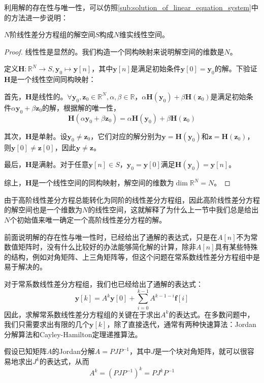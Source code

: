利用解的存在性与唯一性，可以仿照\ref{sub:solution_of_linear_equation_system}中的方法进一步说明：
\begin{theorem}
    $N$阶线性差分方程组的解空间$S$构成$N$维实线性空间。
\end{theorem}
\begin{proof}
    线性性是显然的。我们构造一个同构映射来说明解空间的维数是$N$。

    定义$\mathbf{H}:\mathbb{R}^N\to S,\mathbf{y}_0\mapsto \mathbf{y}[n]$，其中$\mathbf{y}[n]$是满足初始条件$\mathbf{y}[0]=\mathbf{y}_0$的解。下验证$\mathbf{H}$是一个线性空间同构映射：

    首先，$\mathbf{H}$是线性的。$\forall \mathbf{y}_0,\mathbf{z}_0\in\mathbb{R}^N,\alpha,\beta\in\mathbb{R}$，$\alpha \mathbf{H}(\mathbf{y}_0) + \beta \mathbf{H}(\mathbf{z}_0)$是满足初始条件$\alpha \mathbf{y}_0 + \beta \mathbf{z}_0$的解，根据解的唯一性，
    $$\mathbf{H}(\alpha \mathbf{y}_0 + \beta \mathbf{z}_0) = \alpha \mathbf{H}(\mathbf{y}_0) + \beta \mathbf{H}(\mathbf{z}_0)$$

    其次，$\mathbf{H}$是单射。设$\mathbf{y}_0\neq\mathbf{z}_0$，它们对应的解分别为$\mathbf{y}=\mathbf{H}(\mathbf{y}_0)$和$\mathbf{z}=\mathbf{H}(\mathbf{z}_0)$，则$\mathbf{y}[0]\neq\mathbf{z}[0]$，因此$\mathbf{y}\neq\mathbf{z}$。

    最后，$\mathbf{H}$是满射。对于任意$\mathbf{y}[n]\in S$，$\mathbf{y}_0=\mathbf{y}[0]$满足$\mathbf{H}(\mathbf{y}_0)=\mathbf{y}[n]$。

    综上，$\mathbf{H}$是一个线性空间的同构映射，解空间的维数为$\dim \mathbb{R}^N=N$。
\end{proof}

由于高阶线性差分方程总能转化为同阶的线性差分方程组，因此高阶线性差分方程的解空间也是一个维数为$N$的线性空间，这就解释了为什么上一节中我们总是给出$N$个初始值来唯一确定一个高阶线性差分方程的解。

前面说明解的存在性与唯一性时，已经给出了通解的表达式，只是在$A[n]$不为常数值矩阵时，没有什么比较好的办法能够简化解的计算，除非$A[n]$具有某些特殊的结构，例如对角矩阵、上三角矩阵等，但这个问题在常系数线性差分方程组中是易于解决的。

对于常系数线性差分方程组，我们也已经给出了通解的表达式：
$$\mathbf{y}[k] = A^k \mathbf{y}[0] + \sum_{i=0}^{k-1} A^{k-1-i} \mathbf{f}[i]$$
因此，求解常系数线性差分方程组的关键在于求出$A^k$的表达式。在多数问题中，我们只需要求出有限的几个$\mathbf{y}[k]$，除了直接迭代，通常有两种快速算法：Jordan分解算法和Cayley-Hamilton定理递推算法。

假设已知矩阵$A$的Jordan分解$A=PJP^{-1}$，其中$J$是一个块对角矩阵，就可以很容易地求出$J^k$的表达式，从而
$$A^k =(PJP^{-1})^k = P J^k P^{-1}$$

